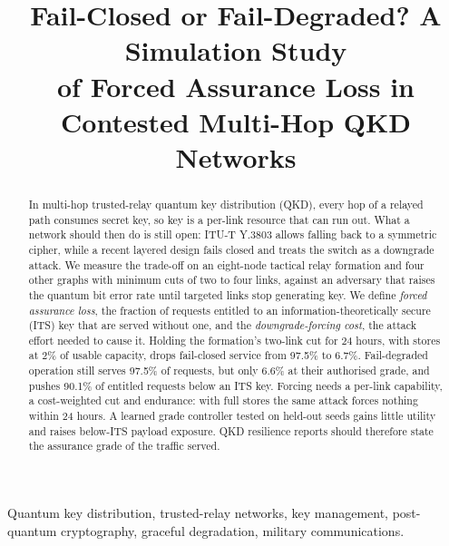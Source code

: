 \documentclass[conference,a4paper]{IEEEtran}
\begin{document}
\title{Fail-Closed or Fail-Degraded? A Simulation Study \\of Forced Assurance
Loss in Contested Multi-Hop QKD Networks}

\author{
\and
{}
}

\maketitle

\begin{abstract}
In multi-hop trusted-relay quantum key distribution (QKD), every hop of a relayed
path consumes secret key, so key is a per-link resource that can run out. What a
network should then do is still open: ITU-T Y.3803 allows falling back to a symmetric
cipher, while a recent layered design fails closed and treats the switch as a
downgrade attack. We measure the trade-off on an eight-node tactical relay formation
and four other graphs with minimum cuts of two to four links, against an adversary
that raises the quantum bit error rate until targeted links stop generating key. We
define \emph{forced assurance loss}, the fraction of requests entitled to an
information-theoretically secure (ITS) key that are served without one, and the
\emph{downgrade-forcing cost}, the attack effort needed to cause it. Holding the
formation's two-link cut for 24 hours, with stores at 2\% of usable capacity, drops
fail-closed service from 97.5\% to 6.7\%. Fail-degraded operation still serves
97.5\% of requests, but only 6.6\% at their authorised grade, and pushes 90.1\% of
entitled requests below an ITS key. Forcing needs a per-link capability, a
cost-weighted cut and endurance: with full stores the same attack forces nothing
within 24 hours. A learned grade controller tested on held-out seeds gains little
utility and raises below-ITS payload exposure. QKD resilience reports should
therefore state the assurance grade of the traffic served.
\end{abstract}

\begin{IEEEkeywords}
Quantum key distribution, trusted-relay networks, key management, post-quantum
cryptography, graceful degradation, military communications.
\end{IEEEkeywords}
\end{document}
